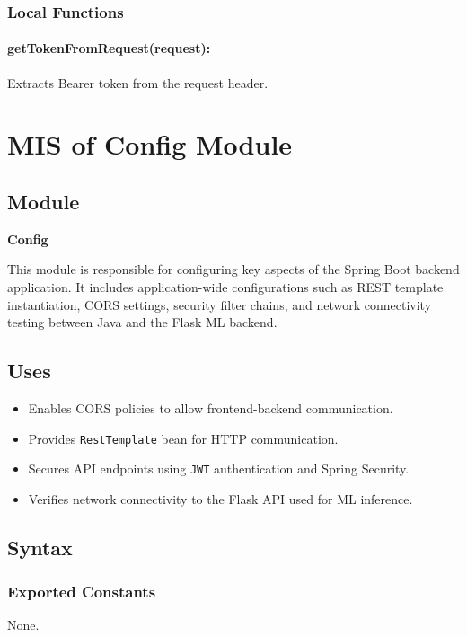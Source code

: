\documentclass[12pt, titlepage]{article}
\begin{document}
\subsubsection{Local Functions}

\paragraph{getTokenFromRequest(request):} Extracts Bearer token from the request header.

\newpage

\section{MIS of Config Module}
\label{sec:ConfigModule}

\subsection{Module}
\label{sec:ConfigModuleModule}

\textbf{Config}

This module is responsible for configuring key aspects of the Spring Boot backend application. It includes application-wide configurations such as REST template instantiation, CORS settings, security filter chains, and network connectivity testing between Java and the Flask ML backend.

\subsection{Uses}
\label{sec:ConfigModuleUses}

\begin{itemize}
    \item Enables CORS policies to allow frontend-backend communication.
    \item Provides \texttt{RestTemplate} bean for HTTP communication.
    \item Secures API endpoints using \texttt{JWT} authentication and Spring Security.
    \item Verifies network connectivity to the Flask API used for ML inference.
\end{itemize}

\subsection{Syntax}
\label{sec:ConfigModuleSyntax}

\subsubsection{Exported Constants}
None.
\end{document}
